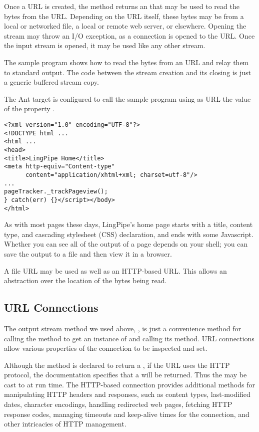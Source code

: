 Once a URL is created, the method  returns an
 that may be used to read the bytes from the URL.
Depending on the URL itself, these bytes may be from a local or
networked file, a local or remote web server, or elsewhere.  Opening
the stream may throw an I/O exception, as a connection is opened to
the URL.  Once the input stream is opened, it may be used like
any other stream.  

The sample program  shows how to read the
bytes from an URL and relay them to standard output.
%
%
The code between the stream creation and its closing is just a generic
buffered stream copy.  

The Ant target  is configured to call the sample
program using as URL the value of the property .
%
\begin{verbatim}
<?xml version="1.0" encoding="UTF-8"?>
<!DOCTYPE html ...
<html ...
<head>
<title>LingPipe Home</title>
<meta http-equiv="Content-type"
      content="application/xhtml+xml; charset=utf-8"/>
...
pageTracker._trackPageview();
} catch(err) {}</script></body>
</html>
\end{verbatim}
%
As with most pages these days, LingPipe's home page starts with
a title, content type, and cascading stylesheet (CSS) declaration,
and ends with some Javascript.  
Whether you can see all of the output of a page depends on your
shell; you can save the output to a file and then view it in a
browser.  

A file URL may be used as well as an HTTP-based URL.  This allows an
abstraction over the location of the bytes being read.  


\subsection{URL Connections}\label{section:url-connections}

The output stream method we used above, , is
just a convenience method for calling the 
method to get an instance of  and calling its
 method.  URL connections allow various
properties of the connection to be inspected and set.  

Although the  method  is declared to
return a , if the URL uses the HTTP protocol, the
documentation specifies that a  will be
returned.  Thus the  may be cast to
 at run time.  The HTTP-based connection
provides additional methods for manipulating HTTP headers and
responses, such as content types, last-modified dates, character
encodings, handling redirected web pages, fetching HTTP response codes,
managing timeouts and keep-alive times for the connection, and other
intricacies of HTTP management.

